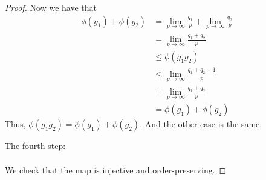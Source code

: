 \begin{proof}
Now we have that
\begin{align*}
\phi(g_1) + \phi(g_2) &= \lim_{p\to \infty} \frac{q_1}{p} + \lim_{p\to\infty} \frac{q_2}{p}\\
&= \lim_{p\to\infty} \frac{q_1+q_2}{p}\\
&\le \phi(g_1g_2)\\
&\le \lim_{p\to\infty} \frac{q_1+q_2 + 1}{p}\\
&= \lim_{p\to\infty} \frac{q_1+q_2}{p}\\
&= \phi(g_1)+\phi(g_2)
\end{align*}
Thus, $\phi(g_1g_2) = \phi(g_1) + \phi(g_2)$.
And the other case is the same.

The fourth step:\\ \\
We check that the map is injective and order-preserving.
\end{proof}